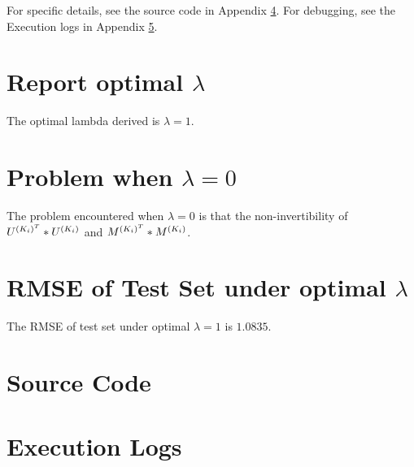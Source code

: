 \documentclass[11pt,a4paper]{article}
\begin{document}
For specific details, see the source code in Appendix \ref{AppdendixA}.
For debugging, see the Execution logs in Appendix \ref{AppdendixB}.

\section{Report optimal $\lambda$}
The optimal lambda derived is $\lambda = 1$.

\section{Problem when $\lambda = 0$}
The problem encountered when $\lambda = 0$ is that the non-invertibility of
$U^{(K_i)^T} * U^{(K_i)}$ and $M^{(K_i)^T} * M^{(K_i)}$.


\section{RMSE of Test Set under optimal $\lambda$}
The RMSE of test set under optimal $\lambda = 1$ is $1.0835$.

\newpage
\appendix
\section{Source Code}
\label{AppdendixA}

\section{Execution Logs}
\label{AppdendixB}


\end{document}

